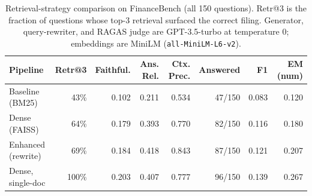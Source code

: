 \begin{table}[t]
\centering
\small
\caption{Retrieval-strategy comparison on FinanceBench (all 150 questions). Retr@3 is the fraction of questions whose top-3 retrieval surfaced the correct filing. Generator, query-rewriter, and RAGAS judge are GPT-3.5-turbo at temperature 0; embeddings are MiniLM (\texttt{all-MiniLM-L6-v2}).}
\label{tab:pipeline-comparison}
\begin{tabular}{lrrrrrrr}
\toprule
Pipeline & Retr@3 & Faithful. & Ans. Rel. & Ctx. Prec. & Answered & F1 & EM (num) \\
\midrule
Baseline (BM25) & 43\% & 0.102 & 0.211 & 0.534 & 47/150 & 0.083 & 0.120 \\
Dense (FAISS) & 64\% & 0.179 & 0.393 & 0.770 & 82/150 & 0.116 & 0.180 \\
Enhanced (rewrite) & 69\% & 0.184 & 0.418 & 0.843 & 87/150 & 0.121 & 0.207 \\
Dense, single-doc & 100\% & 0.203 & 0.407 & 0.777 & 96/150 & 0.139 & 0.267 \\
\bottomrule
\end{tabular}
\end{table}
